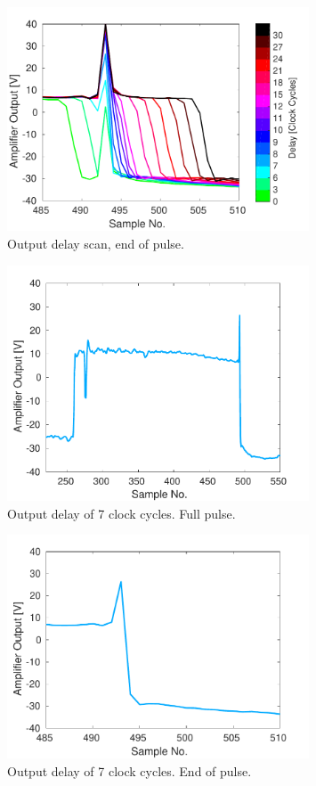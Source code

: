\begin{figure}
  \centering
  \includegraphics[width=0.8\textwidth]{Figures/commissioning/absDelayAll_endPulse}
  \caption{Output delay scan, end of pulse.}
  \label{f:absDelayAll_endPulse}
\end{figure}

\begin{figure}
  \centering
  \includegraphics[width=0.8\textwidth]{Figures/commissioning/absDelay7_all}
  \caption{Output delay of 7 clock cycles. Full pulse.}
  \label{f:absDelay7_all}
\end{figure}

\begin{figure}
  \centering
  \includegraphics[width=0.8\textwidth]{Figures/commissioning/absDelay7_end}
  \caption{Output delay of 7 clock cycles. End of pulse.}
  \label{f:absDelay7_end}
\end{figure}


